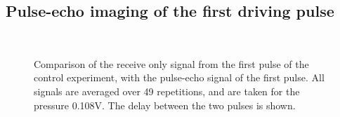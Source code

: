 \subsection{Pulse-echo imaging of the first driving pulse}



\begin{figure}[t]%
  \centering
  \subfloat[1st pulse - 150]{
    \label{fig:1st:av:time:150:comp:control:c1st}
    }
 \quad
  \subfloat[1st pulse - 150]{
    \label{fig:1st:av:time:150:comp:control:i1st}
    }\\
  \subfloat[1st pulse - 250]{
    \label{fig:1st:av:time:250:comp:control:c1st}
    }
 \quad
  \subfloat[1st pulse - 250]{
    \label{fig:1st:av:time:250:comp:control:i1st}
    }
\caption{
    Comparison of the  receive only signal from the first pulse of the control experiment,
    with the pulse-echo signal of the first pulse.
    All signals are averaged over 49 repetitions, and are taken for the pressure 0.108V.
    The delay between the two pulses is shown.
  }
  \label{fig:1st:av:time:comp:control}
\end{figure}

